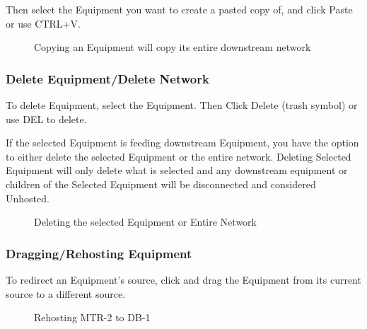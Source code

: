 \documentclass[letterpaper,10pt,english]{sphinxmanual}
\begin{document}
Then select the Equipment you want to create a pasted copy of, and click Paste or use CTRL+V.

\begin{figure}[H]
\centering
\capstart

\noindent{}
\caption{Copying an Equipment will copy its entire downstream network}\label{\detokenize{docs/userguide/buildingelectricalmodel/one-line/index-one-line:id6}}\end{figure}


\subsubsection{Delete Equipment/Delete Network}
\label{\detokenize{docs/userguide/buildingelectricalmodel/one-line/index-one-line:delete-equipment-delete-network}}
To delete Equipment, select the Equipment.  Then Click Delete (trash symbol) or use DEL to delete.

If the selected Equipment is feeding downstream Equipment, you have the option to either delete the selected Equipment or the entire network.  Deleting Selected Equipment will only delete what is selected and any downstream equipment or children of the Selected Equipment will be disconnected and considered Unhosted.

\begin{figure}[H]
\centering
\capstart

\noindent{}
\caption{Deleting the selected Equipment or Entire Network}\label{\detokenize{docs/userguide/buildingelectricalmodel/one-line/index-one-line:id7}}\end{figure}


\subsubsection{Dragging/Rehosting Equipment}
\label{\detokenize{docs/userguide/buildingelectricalmodel/one-line/index-one-line:dragging-rehosting-equipment}}\label{\detokenize{docs/userguide/buildingelectricalmodel/one-line/index-one-line:one-line-rehosting}}
To redirect an Equipment’s source, click and drag the Equipment from its current source to a different source.

\begin{figure}[H]
\centering
\capstart

\noindent{}
\caption{Rehosting MTR-2 to DB-1}\label{\detokenize{docs/userguide/buildingelectricalmodel/one-line/index-one-line:id8}}\end{figure}
\end{document}
